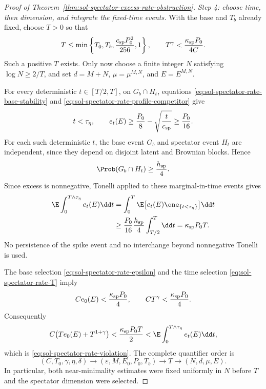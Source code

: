 \documentclass[../main.tex]{subfiles}
\begin{document}
\begin{proof}[Proof of Theorem~\ref{thm:sol-spectator-excess-rate-obstruction}]
\emph{Step 4: choose time, then dimension, and integrate the fixed-time events.}
With the base and $T_b$ already fixed, choose $T>0$ so that
\begin{equation}
  T\le\min\left\{T_0,T_b,\frac{c_{\rm sp}P_0^2}{256},1\right\},
  \qquad
  T^\gamma<\frac{\kappa_{\rm sp}P_0}{4C}.
  \label{eq:sol-spectator-rate-T}
\end{equation}
Such a positive $T$ exists.  Only now choose a finite integer $N$ satisfying
$\log N\ge2/T$, and set $d=M+N$, $\mu=\mu^{M,N}$, and $E=E^{M,N}$.

For every deterministic $t\in[T/2,T]$, on $G_b\cap H_t$, equations
\eqref{eq:sol-spectator-rate-base-stability} and
\eqref{eq:sol-spectator-rate-profile-competitor} give
\begin{equation}
  t<\tau_\eta,
  \qquad
  e_t(E)\ge\frac{P_0}{8}-\sqrt{\frac{t}{c_{\rm sp}}}
  \ge\frac{P_0}{16}.
  \label{eq:sol-spectator-rate-excess-lower}
\end{equation}
For each such deterministic $t$, the base event $G_b$ and spectator event $H_t$ are
independent, since they depend on disjoint latent and Brownian blocks.  Hence
\[
  \Prob(G_b\cap H_t)\ge\frac{h_{\rm sp}}4.
\]
Since excess is nonnegative, Tonelli applied to these marginal-in-time events gives
\begin{align}
  \E\int_0^{T\wedge\tau_\eta}e_t(E)\dd t
  &=\int_0^T\E\bigl[e_t(E)\one_{\{t<\tau_\eta\}}\bigr]\dd t
  \notag\\
  &\ge\frac{P_0}{16}\frac{h_{\rm sp}}4\int_{T/2}^T\dd t
  =\kappa_{\rm sp}P_0T.
  \label{eq:sol-spectator-rate-integrated-lower}
\end{align}
No persistence of the spike event and no interchange beyond nonnegative Tonelli is used.

The base selection \eqref{eq:sol-spectator-rate-epsilon} and the time selection
\eqref{eq:sol-spectator-rate-T} imply
\[
  Ce_0(E)<\frac{\kappa_{\rm sp}P_0}{4},
  \qquad
  CT^\gamma<\frac{\kappa_{\rm sp}P_0}{4}.
\]
Consequently
\[
  C\bigl(Te_0(E)+T^{1+\gamma}\bigr)
  <\frac{\kappa_{\rm sp}P_0T}{2}
  <\E\int_0^{T\wedge\tau_\eta}e_t(E)\dd t,
\]
which is \eqref{eq:sol-spectator-rate-violation}.  The complete quantifier order is
\[
  (C,T_0,\gamma,\eta,\delta)
  \longrightarrow(\varepsilon,M,E_0,P_0,T_b)
  \longrightarrow T
  \longrightarrow(N,d,\mu,E).
\]
In particular, both near-minimality estimates were fixed uniformly in $N$ before $T$ and the
spectator dimension were selected.
\end{proof}
\end{document}
